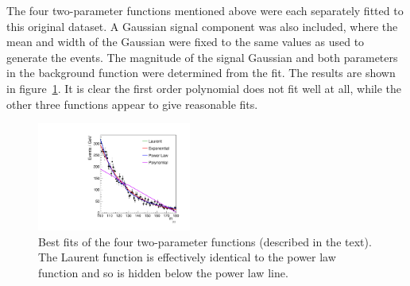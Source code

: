 The four two-parameter functions mentioned above were each 
separately fitted to this
original dataset. A Gaussian signal component was also included, where the
mean and width of the Gaussian were fixed to the same values as used to
generate the events.
The magnitude of the signal Gaussian and both parameters in the
background function were determined from the fit.
The results are shown in figure~\ref{fig:functions:bestfits}.
It is clear the first order polynomial does not fit well at all, while the 
other three functions appear to give reasonable fits.
%
\begin{figure}[tbp]
\centering
\includegraphics[width=0.45\textwidth]{functions/BestFits.pdf}
\caption{Best fits of the four two-parameter functions (described in the
text). The Laurent function is effectively identical to the power law function
and so is hidden below the power law line.}
\label{fig:functions:bestfits}
\end{figure}

